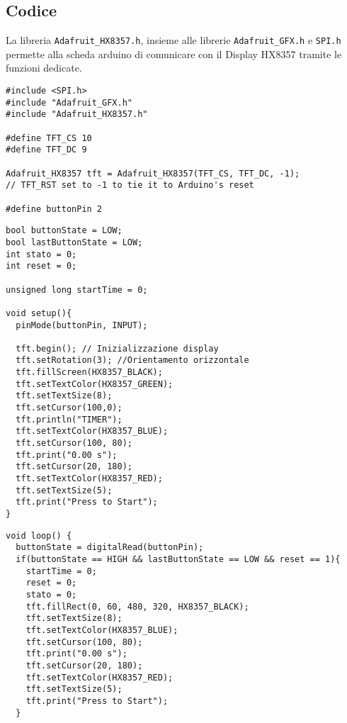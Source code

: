 \subsection{Codice}
La libreria \texttt{Adafruit\_HX8357.h}, insieme alle librerie \texttt{Adafruit\_GFX.h} e \texttt{SPI.h} permette alla scheda arduino di comunicare con il Display HX8357 tramite le funzioni dedicate.
\begin{lstlisting}[frame=single, language=Arduino]
#include <SPI.h>
#include "Adafruit_GFX.h"
#include "Adafruit_HX8357.h"

#define TFT_CS 10
#define TFT_DC 9

Adafruit_HX8357 tft = Adafruit_HX8357(TFT_CS, TFT_DC, -1); 
// TFT_RST set to -1 to tie it to Arduino's reset

#define buttonPin 2
\end{lstlisting}
\clearpage
\begin{lstlisting}[frame=single, language=Arduino]
bool buttonState = LOW;
bool lastButtonState = LOW;
int stato = 0;
int reset = 0;

unsigned long startTime = 0;

void setup(){  
  pinMode(buttonPin, INPUT);
  
  tft.begin(); // Inizializzazione display
  tft.setRotation(3); //Orientamento orizzontale
  tft.fillScreen(HX8357_BLACK);
  tft.setTextColor(HX8357_GREEN);
  tft.setTextSize(8); 
  tft.setCursor(100,0);
  tft.println("TIMER");
  tft.setTextColor(HX8357_BLUE);
  tft.setCursor(100, 80);
  tft.print("0.00 s");
  tft.setCursor(20, 180);
  tft.setTextColor(HX8357_RED);
  tft.setTextSize(5);
  tft.print("Press to Start");
}
\end{lstlisting}
\begin{lstlisting}[frame=single, language=Arduino]
void loop() {
  buttonState = digitalRead(buttonPin);
  if(buttonState == HIGH && lastButtonState == LOW && reset == 1){
    startTime = 0;
    reset = 0;
    stato = 0;
    tft.fillRect(0, 60, 480, 320, HX8357_BLACK); 
    tft.setTextSize(8);
    tft.setTextColor(HX8357_BLUE);
    tft.setCursor(100, 80);
    tft.print("0.00 s");
    tft.setCursor(20, 180);
    tft.setTextColor(HX8357_RED);
    tft.setTextSize(5);
    tft.print("Press to Start");
  }
\end{lstlisting}
\clearpage
